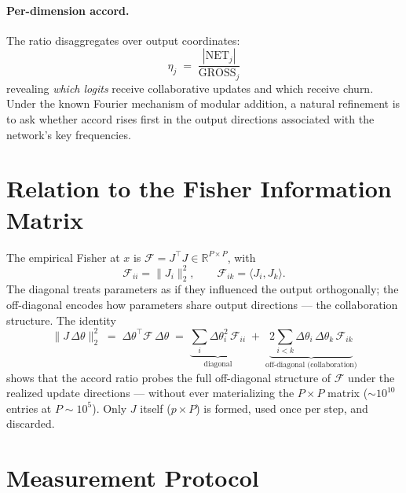 \documentclass[11pt]{article}
\begin{document}
\paragraph{Per-dimension accord.} The ratio disaggregates over output coordinates:
\begin{equation}
    \eta_j \;=\; \frac{|\mathrm{NET}_j|}{\mathrm{GROSS}_j}
\end{equation}
revealing \emph{which logits} receive collaborative updates and which receive churn.
Under the known Fourier mechanism of modular addition, a natural refinement is to ask whether
accord rises first in the output directions associated with the network's key frequencies.

\section{Relation to the Fisher Information Matrix}

The empirical Fisher at $x$ is $\mathcal{F} = J^\top J \in \mathbb{R}^{P \times P}$, with
\begin{equation}
    \mathcal{F}_{ii} = \|J_i\|_2^2, \qquad
    \mathcal{F}_{ik} = \langle J_i, J_k \rangle .
\end{equation}
The diagonal treats parameters as if they influenced the output orthogonally; the off-diagonal
encodes how parameters share output directions --- the collaboration structure. The identity
\begin{equation}
    \|J\,\Delta\theta\|_2^2
    \;=\; \Delta\theta^\top \mathcal{F}\, \Delta\theta
    \;=\; \underbrace{\sum_i \Delta\theta_i^2\, \mathcal{F}_{ii}}_{\text{diagonal}}
    \;+\; \underbrace{2 \sum_{i<k} \Delta\theta_i\, \Delta\theta_k\, \mathcal{F}_{ik}}_{\text{off-diagonal (collaboration)}}
\end{equation}
shows that the accord ratio probes the full off-diagonal structure of $\mathcal{F}$ under the
realized update directions --- without ever materializing the $P \times P$ matrix
($\sim 10^{10}$ entries at $P \sim 10^5$). Only $J$ itself ($p \times P$) is formed, used once
per step, and discarded.

\section{Measurement Protocol}
\end{document}
